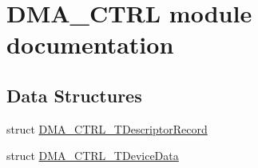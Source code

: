 \hypertarget{group___d_m_a___c_t_r_l__module}{\section{D\-M\-A\-\_\-\-C\-T\-R\-L module documentation}
\label{group___d_m_a___c_t_r_l__module}
}
\subsection*{Data Structures}
\begin{DoxyCompactItemize}
\item 
struct \hyperlink{struct_d_m_a___c_t_r_l___t_descriptor_record}{D\-M\-A\-\_\-\-C\-T\-R\-L\-\_\-\-T\-Descriptor\-Record}
\item 
struct \hyperlink{struct_d_m_a___c_t_r_l___t_device_data}{D\-M\-A\-\_\-\-C\-T\-R\-L\-\_\-\-T\-Device\-Data}
\end{DoxyCompactItemize}
